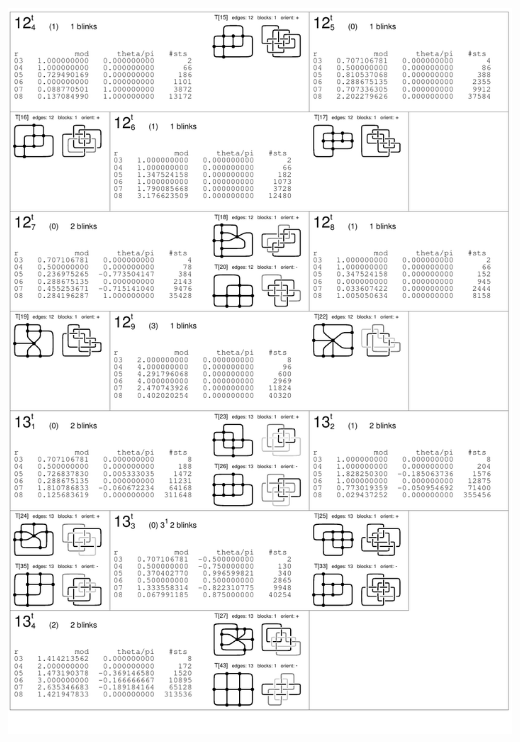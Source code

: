 \begin{center}
 \includegraphics[height=23.5cm]{E.figsbw2/con3catalog002_bw.pdf} \eject

\end{center}
